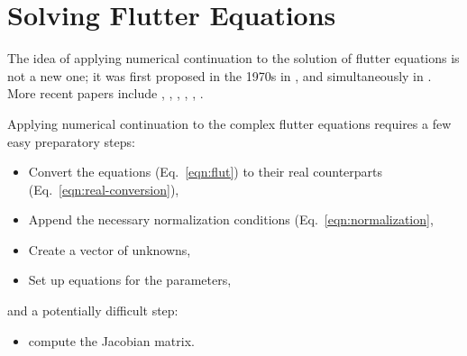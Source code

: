 \documentclass[10pt,openany,twoside]{book}
\numberwithin{equation}{section}   %
\newcommand{\Eqn}[1]{Eq.\ \ref{#1}}
\begin{document}
\chapter{Solving Flutter Equations}\label{chap:application}

The idea of applying numerical continuation to the solution of
flutter equations is not a new one; it was first proposed in the 1970s in
\cite{cardani1978continuation}, and simultaneously in \cite{meyer1982aeroelastic}.
More recent papers include \cite{yu2020nonlinear}, \cite{meyer2016continuation}, 
\cite{meyer2015continuation}, \cite{meyer2014unified},
\cite{potkanski2008lco}, \cite{meyer1988application}.

Applying numerical continuation to the complex flutter
equations requires a few easy preparatory steps:
\begin{itemize}
	\item Convert the equations (\Eqn{eqn:flut}) to their real counterparts
		(\Eqn{eqn:real-conversion}),
	\item Append the necessary normalization conditions (\Eqn{eqn:normalization},
	\item Create a vector of unknowns,
	\item Set up equations for the parameters,
\end{itemize}
and a potentially difficult step:
\begin{itemize}
	\item compute the Jacobian matrix.
\end{itemize}
\end{document}
